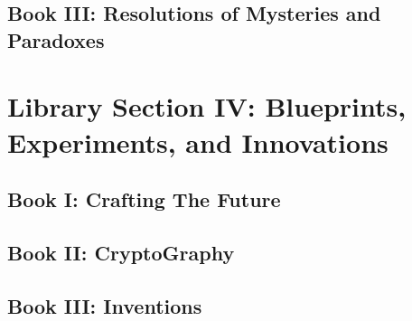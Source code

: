 \documentclass[a4paper,12pt]{book}
\begin{document}
\chapter{Book III: Resolutions of Mysteries and Paradoxes}



\part{Library Section IV: Blueprints, Experiments, and Innovations}

\chapter{Book I: Crafting The Future}







\chapter{Book II: CryptoGraphy}



\chapter{Book III: Inventions}


\end{document}
